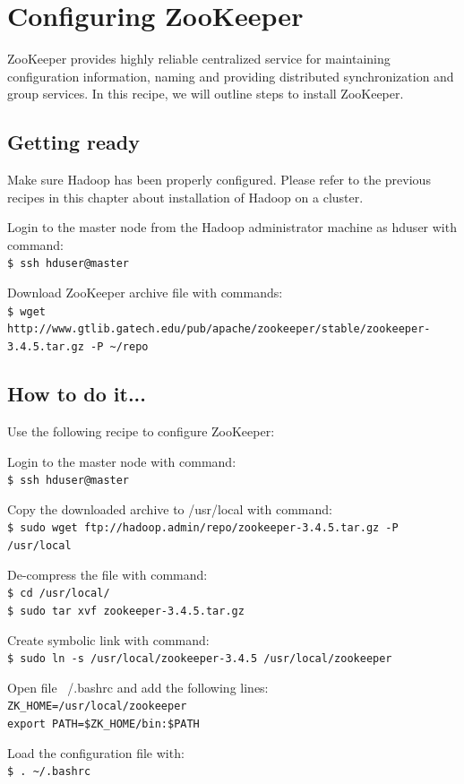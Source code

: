 \section{Configuring ZooKeeper}
ZooKeeper provides highly reliable centralized service for maintaining configuration information, naming and providing distributed synchronization and group services. In this recipe, we will outline steps to install ZooKeeper.

\subsection*{Getting ready}
Make sure Hadoop has been properly configured. Please refer to the previous recipes in this chapter about installation of Hadoop on a cluster.

Login to the master node from the Hadoop administrator machine as hduser with command: \\
\verb|$ ssh hduser@master|

Download ZooKeeper archive file with commands: \\
\verb|$ wget http://www.gtlib.gatech.edu/pub/apache/zookeeper/stable/zookeeper-3.4.5.tar.gz -P ~/repo|

\subsection*{How to do it...}
Use the following recipe to configure ZooKeeper:

Login to the master node with command: \\
\verb|$ ssh hduser@master|

Copy the downloaded archive to /usr/local with command: \\
\verb|$ sudo wget ftp://hadoop.admin/repo/zookeeper-3.4.5.tar.gz -P /usr/local|

De-compress the file with command: \\
\verb|$ cd /usr/local/| \\
\verb|$ sudo tar xvf zookeeper-3.4.5.tar.gz|

Create symbolic link with command:\\
\verb|$ sudo ln -s /usr/local/zookeeper-3.4.5 /usr/local/zookeeper|

Open file ~/.bashrc and add the following lines: \\
\verb|ZK_HOME=/usr/local/zookeeper| \\
\verb|export PATH=$ZK_HOME/bin:$PATH|

Load the configuration file with: \\
\verb|$ . ~/.bashrc|

